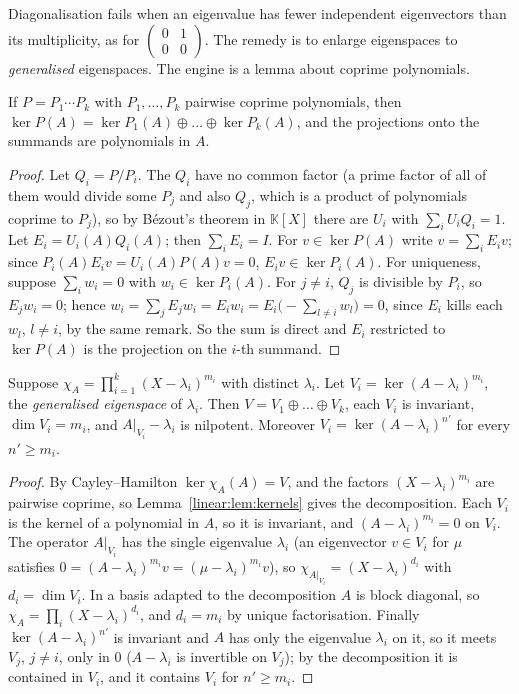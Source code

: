 Diagonalisation fails when an eigenvalue has fewer independent eigenvectors than its multiplicity, as for
$\begin{pmatrix}0&1\\0&0\end{pmatrix}$. The remedy is to enlarge eigenspaces to \emph{generalised} eigenspaces. The engine is
a lemma about coprime polynomials.

\begin{lemma}\label{linear:lem:kernels}
If $P=P_1\cdots P_k$ with $P_1,\dots,P_k$ pairwise coprime polynomials, then
$\ker P(A)=\ker P_1(A)\oplus\dots\oplus\ker P_k(A)$, and the projections onto the summands are polynomials in $A$.
\end{lemma}
\begin{proof}
Let $Q_i=P/P_i$. The $Q_i$ have no common factor (a prime factor of all of them would divide some $P_j$ and also $Q_j$,
which is a product of polynomials coprime to $P_j$), so by B\'ezout's theorem in $\mathbb K[X]$ there are $U_i$ with
$\sum_iU_iQ_i=1$. Let $E_i=U_i(A)Q_i(A)$; then $\sum_iE_i=I$. For $v\in\ker P(A)$ write $v=\sum_iE_iv$; since
$P_i(A)E_iv=U_i(A)P(A)v=0$, $E_iv\in\ker P_i(A)$. For uniqueness, suppose $\sum_iw_i=0$ with $w_i\in\ker P_i(A)$. For $j\ne i$,
$Q_j$ is divisible by $P_i$, so $E_jw_i=0$; hence $w_i=\sum_jE_jw_i=E_iw_i=E_i\bigl(-\sum_{l\ne i}w_l\bigr)=0$, since $E_i$ kills
each $w_l$, $l\ne i$, by the same remark. So the sum is direct and $E_i$ restricted to $\ker P(A)$ is the projection on
the $i$-th summand.
\end{proof}

\begin{theorem}\label{linear:thm:geneigen}
Suppose $\chi_A=\prod_{i=1}^k(X-\lambda_i)^{m_i}$ with distinct $\lambda_i$. Let $V_i=\ker(A-\lambda_i)^{m_i}$, the
\emph{generalised eigenspace} of $\lambda_i$. Then $V=V_1\oplus\dots\oplus V_k$, each $V_i$ is invariant, $\dim V_i=m_i$, and
$A|_{V_i}-\lambda_i$ is nilpotent. Moreover $V_i=\ker(A-\lambda_i)^{n'}$ for every $n'\ge m_i$.
\end{theorem}
\begin{proof}
By Cayley--Hamilton $\ker\chi_A(A)=V$, and the factors $(X-\lambda_i)^{m_i}$ are pairwise coprime, so Lemma~\ref{linear:lem:kernels}
gives the decomposition. Each $V_i$ is the kernel of a polynomial in $A$, so it is invariant, and $(A-\lambda_i)^{m_i}=0$ on
$V_i$. The operator $A|_{V_i}$ has the single eigenvalue $\lambda_i$ (an eigenvector $v\in V_i$ for $\mu$ satisfies
$0=(A-\lambda_i)^{m_i}v=(\mu-\lambda_i)^{m_i}v$), so $\chi_{A|_{V_i}}=(X-\lambda_i)^{d_i}$ with $d_i=\dim V_i$. In a basis adapted to the
decomposition $A$ is block diagonal, so $\chi_A=\prod_i(X-\lambda_i)^{d_i}$, and $d_i=m_i$ by unique factorisation. Finally
$\ker(A-\lambda_i)^{n'}$ is invariant and $A$ has only the eigenvalue $\lambda_i$ on it, so it meets $V_j$, $j\ne i$, only in
$0$ ($A-\lambda_i$ is invertible on $V_j$); by the decomposition it is contained in $V_i$, and it contains $V_i$ for $n'\ge
m_i$.
\end{proof}

